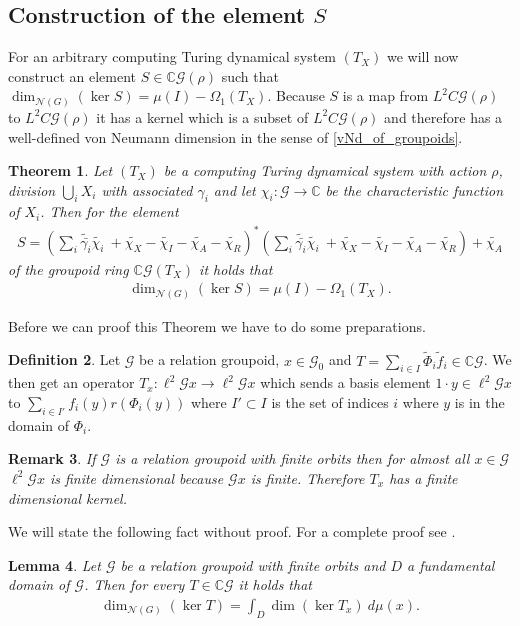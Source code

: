 \documentclass[12pt,a4paper]{scrartcl}
\theoremstyle{plain}
\newtheorem{Theorem}{Theorem}[section]
\newtheorem{Lemma}[Theorem]{Lemma}
\newtheorem{Remark}[Theorem]{Remark}
\theoremstyle{definition}
\newtheorem{Definition}[Theorem]{Definition}
\numberwithin{equation}{section}
\newcommand{\C}{\mathbb{C}} %
\newcommand{\2}{\mathbb{Z} / 2 \mathbb{Z}}
\newcommand{\G}{\mathcal{G}}
\newcommand{\1}{\bar{1}}
\newcommand{\0}{\bar{0}}
\begin{document}
\subsection{Construction of the element $S$}
For an arbitrary computing Turing dynamical system $(T_X)$ we will now construct an element $S \in \C \G (\rho)$ such that $\dim_{\mathcal{N}(G)}(\ker S) = \mu(I) - \Omega_1(T_X)$. Because $S$ is a map from $L^2C \G (\rho)$ to $L^2C \G (\rho)$ it has a kernel which is a subset of $L^2C \G (\rho)$ and therefore has a well-defined von Neumann dimension in the sense of \ref{vNd_of_groupoids}.


\begin{Theorem} \label{groserSatz}
	Let $(T_X)$ be a computing Turing dynamical system with action $\rho$, division $\bigcup_i X_i$ with associated $\gamma_i$ and let $\chi_i : \G \to \C$ be the characteristic function of $X_i$. Then for the element
	\begin{align*}
		S = (\sum_{i} \tilde{\bar{\gamma_i}} \tilde{\chi_i} \ + \tilde{\chi_X} - \tilde{\chi_I} - \tilde{\chi_A} - \tilde{\chi_R})^*(\sum_{i} \tilde{\bar{\gamma_i}} \tilde{\chi_i} \ + \tilde{\chi_X} - \tilde{\chi_I} - \tilde{\chi_A} - \tilde{\chi_R}) + \tilde{\chi_A}
	\end{align*}
	of the groupoid ring $\C \G(T_X)$ it holds that
	\begin{align*}
		\dim_{\mathcal{N}(G)}(\ker S) = \mu(I) - \Omega_1(T_X).
	\end{align*}
\end{Theorem}
Before we can proof this Theorem we have to do some preparations. 
\begin{Definition}
	Let $\G$ be a relation groupoid, $x \in \G_0$ and $T = \sum_{i \in I} \tilde \Phi_i\tilde f_i \in \C\G$. We then get an operator $T_x: \ell^2\G x \to \ell^2\G x$ which sends a basis element $1 \cdot y \in \ell^2\G x$ to $\sum_{i \in I'} f_i(y) r(\Phi_i(y)) $ where $I' \subset I$ is the set of indices $i$ where $y$ is in the domain of $\Phi_i$. 
\end{Definition}
\begin{Remark}
	If $\G$ is a relation groupoid with finite orbits then for almost all $x \in \G$ $\ell^2\G x$ is finite dimensional because $\G x$ is finite. Therefore $T_x$ has a finite dimensional kernel.
\end{Remark}
We will state the following fact without proof. For a complete proof see \cite{GRAB}.
\begin{Lemma} \label{T_to_Tx}
	Let $\G$ be a relation groupoid with finite orbits and $D$ a fundamental domain of $\G$. Then for every $T \in \C \G$ it holds that
	\begin{align*}
		\dim_{\mathcal{N}(G)}(\ker T) = \int_D \dim (\ker T_x) \ d \mu (x).
	\end{align*} 
\end{Lemma}
\end{document}
